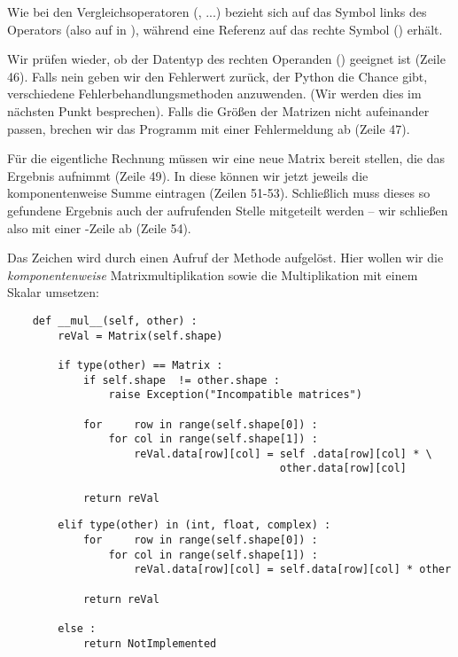 Wie bei den Vergleichsoperatoren (, ...) bezieht sich  auf das Symbol links des Operators (also auf  in ), während  eine Referenz auf das rechte Symbol () erhält.

Wir prüfen wieder, ob der Datentyp des rechten Operanden () geeignet ist (Zeile 46). Falls nein geben wir den Fehlerwert  zurück, der Python die Chance gibt, verschiedene Fehlerbehandlungsmethoden anzuwenden. (Wir werden dies im nächsten Punkt besprechen). Falls die Größen der Matrizen nicht aufeinander passen, brechen wir das Programm mit einer Fehlermeldung ab (Zeile 47).

Für die eigentliche Rechnung müssen wir eine neue Matrix bereit stellen, die das Ergebnis aufnimmt (Zeile 49). In diese können wir jetzt jeweils die komponentenweise Summe eintragen (Zeilen 51-53). Schließlich muss dieses so gefundene Ergebnis auch der aufrufenden Stelle mitgeteilt werden -- wir schließen also mit einer -Zeile ab (Zeile 54).

Das Zeichen \inPy{*} wird durch einen Aufruf der Methode  aufgelöst. Hier wollen wir die \emph{komponentenweise} Matrixmultiplikation sowie die Multiplikation mit einem Skalar umsetzen:

\begin{codebox}
\begin{verbatim}
    def __mul__(self, other) :
        reVal = Matrix(self.shape)
        
        if type(other) == Matrix :
            if self.shape  != other.shape :
                raise Exception("Incompatible matrices")
            
            for     row in range(self.shape[0]) :
                for col in range(self.shape[1]) :
                    reVal.data[row][col] = self .data[row][col] * \
                                           other.data[row][col]
            
            return reVal
\end{verbatim}
\end{codebox}
\begin{codebox}[]
\begin{verbatim}
        elif type(other) in (int, float, complex) :
            for     row in range(self.shape[0]) :
                for col in range(self.shape[1]) :
                    reVal.data[row][col] = self.data[row][col] * other
            
            return reVal
        
        else :
            return NotImplemented
\end{verbatim}
\end{codebox}

